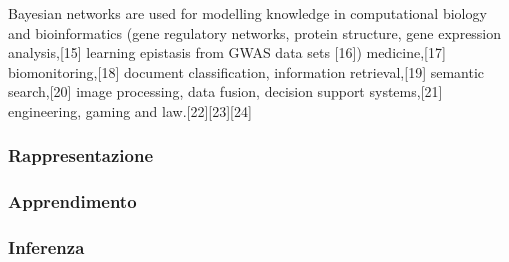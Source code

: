 Bayesian networks are used for modelling knowledge in computational biology and bioinformatics (gene regulatory networks, protein structure, gene expression analysis,[15] learning epistasis from GWAS data sets [16]) medicine,[17] biomonitoring,[18] document classification, information retrieval,[19] semantic search,[20] image processing, data fusion, decision support systems,[21] engineering, gaming and law.[22][23][24]

\subsubsection{Rappresentazione}

\begin{definizione}[\bn{}]
\end{definizione} 

\begin{definizione}[Indipendenza]
\end{definizione} 

\begin{definizione}
\end{definizione} 

\subsubsection{Apprendimento}

\subsubsection{Inferenza}

\subsection{\mprocess{}}
\label{sec:mps}

\begin{definizione}
\end{definizione} 

\begin{definizione}[\upcase\omprocess{}]
\end{definizione} 

\begin{definizione}
\end{definizione} 

\begin{definizione}[\upcase\cmprocess{}]
\end{definizione} 

